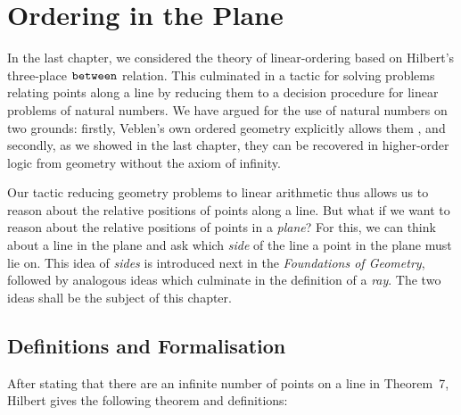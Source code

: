 \chapter{Ordering in the Plane}\label{chapter:HalfPlanes}

In the last chapter, we considered the theory of linear-ordering based on Hilbert's three-place $\texttt{between}$ relation. This culminated in a tactic for solving problems relating points along a line by reducing them to a decision procedure for linear problems of natural numbers. We have argued for the use of natural numbers on two grounds: firstly, Veblen's own ordered geometry explicitly allows them \cite{Veblenphd}, and secondly, as we showed in the last chapter, they can be recovered in higher-order logic from geometry without the axiom of infinity.

Our tactic reducing geometry problems to linear arithmetic thus allows us to reason about the relative positions of points along a line. But what if we want to reason about the relative positions of points in a \emph{plane}? For this, we can think about a line in the plane and ask which \emph{side} of the line a point in the plane must lie on. This idea of \emph{sides} is introduced next in the \emph{Foundations of Geometry}, followed by analogous ideas which culminate in the definition of a \emph{ray}. The two ideas shall be the subject of this chapter. 

\section{Definitions and Formalisation}
After stating that there are an infinite number of points on a line in Theorem~7, Hilbert gives the following theorem and definitions:


